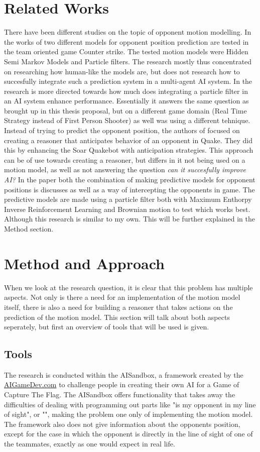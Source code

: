 \documentclass[a4paper, 12pt]{article}
\begin{document}
\section{Related Works}
There have been different studies on the topic of opponent motion modelling.
In the works of \citep{Hladky_anevaluation} two different models for opponent
position prediction are tested in the team oriented game Counter strike. 
The tested motion models were
Hidden Semi Markov Models and Particle filters.
The research mostly thus concentrated on researching how human-like the
models are, but does not research how to succesfully integrate such a
prediction system in a multi-agent AI system.
In \citep{weber2011aiide} the research is more directed towards how much does
integrating a particle filter in an AI system enhance performance. Essentially it answers
the same question as brought up in this thesis proposal, but on a different game
domain (Real Time Strategy instead of First Person Shooter) as well was using a
different tehnique. 
Instead of trying to predict the opponent position, the authors of
\citep{Laird:2001:KYG:375735.376343} focused on creating a reasoner that
anticipates behavior of an opponent in Quake. They did this by enhancing the
Soar Quakebot with anticipation strategies. This approach can be of use towards
creating a reasoner, but differs in it not being used on a motion model, as well
as not answering the question \emph{can it succesfully improve AI?}
In the paper \citep{6374144} both the combination of making predictive models
for opponent positions is discusses as well as a way of intercepting the
opponents in game. The predictive models are made using a particle filter both
with Maximum Enthorpy Inverse Reinforcement Learning and Brownian motion to test
which works best. Although this research is similar to my own. This will be
further explained in the Method section.

\section{Method and Approach}
When we look at the research question, it is clear that this problem has multiple aspects. Not
only is there a need for an implementation of the motion model itself, there is
also a need for building a reasoner that takes actions on the prediction of the
motion model. This section will talk about both aspects seperately, but first an
overview of tools that will be used is given.

\subsection{Tools}
The research is conducted within the AISandbox, a framework created by the
\url{AIGameDev.com} to challenge people in creating their own AI for a Game of
Capture The Flag. The AISandbox offers functionality that takes away the
difficulties of dealing with programming out parts like "is my opponent in my
line of sight", or "", making the
problem one only of implementing the motion model. The framework also does not
give information about the opponents position, except for the case in which the
opponent is directly in the line of sight of one of the teammates, exactly as
one would expect in real life.
\end{document}
